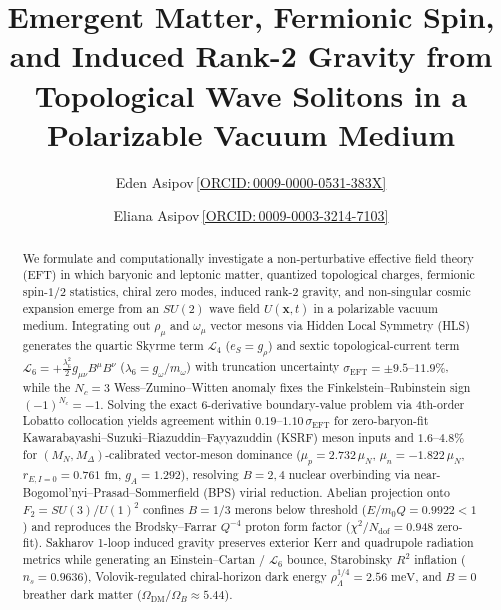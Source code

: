 \documentclass[10pt,aps,prd,twocolumn,superscriptaddress,nofootinbib,floatfix,longbibliography,showkeys]{revtex4-2}
\makeatletter
\let\do@date\relax
\providecommand{\orcid}[1]{\,\href{https://orcid.org/#1}{\normalfont\footnotesize[ORCID:\,#1]}}
\makeatother
\begin{document}
\title{Emergent Matter, Fermionic Spin, and Induced Rank-2 Gravity from Topological Wave Solitons in a Polarizable Vacuum Medium}

\author{Eden Asipov\orcid{0009-0000-0531-383X}}

\author{Eliana Asipov\orcid{0009-0003-3214-7103}}

\makeatletter\let\do@date\relax\makeatother

\begin{abstract}
We formulate and computationally investigate a non-perturbative effective field theory (EFT) in which baryonic and leptonic matter, quantized topological charges, fermionic spin-$1/2$ statistics, chiral zero modes, induced rank-2 gravity, and non-singular cosmic expansion emerge from an $SU(2)$ wave field $U(\mathbf{x}, t)$ in a polarizable vacuum medium. Integrating out $\rho_\mu$ and $\omega_\mu$ vector mesons via Hidden Local Symmetry (HLS) generates the quartic Skyrme term $\mathcal{L}_4$ ($e_S = g_\rho$) and sextic topological-current term $\mathcal{L}_6 = +\frac{\lambda_6^2}{2} g_{\mu\nu} B^\mu B^\nu$ ($\lambda_6 = g_\omega/m_\omega$) with truncation uncertainty $\sigma_{\text{EFT}} = \pm 9.5\text{--}11.9\%$, while the $N_c = 3$ Wess--Zumino--Witten anomaly fixes the Finkelstein--Rubinstein sign $(-1)^{N_c} = -1$. Solving the exact 6-derivative boundary-value problem via 4th-order Lobatto collocation yields agreement within $0.19\text{--}1.10\,\sigma_{\text{EFT}}$ for zero-baryon-fit Kawarabayashi--Suzuki--Riazuddin--Fayyazuddin (KSRF) meson inputs and $1.6\text{--}4.8\%$ for $(M_N, M_\Delta)$-calibrated vector-meson dominance ($\mu_p = 2.732\,\mu_N$, $\mu_n = -1.822\,\mu_N$, $r_{E,I=0} = 0.761\text{ fm}$, $g_A = 1.292$), resolving $B=2,4$ nuclear overbinding via near-Bogomol'nyi--Prasad--Sommerfield (BPS) virial reduction. Abelian projection onto $F_2 = SU(3)/U(1)^2$ confines $B=1/3$ merons below threshold ($E/m_0 Q = 0.9922 < 1$) and reproduces the Brodsky--Farrar $Q^{-4}$ proton form factor ($\chi^2/N_{\text{dof}} = 0.948$ zero-fit). Sakharov 1-loop induced gravity preserves exterior Kerr and quadrupole radiation metrics while generating an Einstein--Cartan / $\mathcal{L}_6$ bounce, Starobinsky $R^2$ inflation ($n_s = 0.9636$), Volovik-regulated chiral-horizon dark energy $\rho_\Lambda^{1/4} = 2.56\text{ meV}$, and $B=0$ breather dark matter ($\Omega_{\text{DM}}/\Omega_B \approx 5.44$).
\end{abstract}
\end{document}
